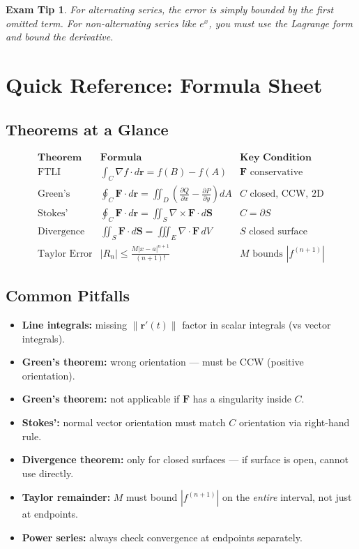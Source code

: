 \documentclass[12pt]{article}
\newcommand{\grad}{\nabla}
\newcommand{\curl}{\nabla\times}
\newcommand{\divg}{\nabla\cdot}
\newtheorem{tip}{Exam Tip}[section]
\begin{document}
\begin{tip}
For alternating series, the error is simply bounded by the first omitted term. For non-alternating series like \(e^x\), you must use the Lagrange form and bound the derivative.
\end{tip}

\section*{Quick Reference: Formula Sheet}
\subsection*{Theorems at a Glance}
\[
\begin{array}{lll}
\textbf{Theorem} & \textbf{Formula} & \textbf{Key Condition} \\
\hline
\text{FTLI} & \int_C \grad f\cdot d\mathbf{r}=f(B)-f(A) & \mathbf{F}\text{ conservative} \\
\text{Green's} & \oint_C \mathbf{F}\cdot d\mathbf{r}=\iint_D \left(\frac{\partial Q}{\partial x}-\frac{\partial P}{\partial y}\right)dA & C\text{ closed, CCW, 2D} \\
\text{Stokes'} & \oint_C \mathbf{F}\cdot d\mathbf{r}=\iint_S \curl\mathbf{F}\cdot d\mathbf{S} & C=\partial S \\
\text{Divergence} & \iint_S \mathbf{F}\cdot d\mathbf{S}=\iiint_E \divg\mathbf{F}\,dV & S\text{ closed surface} \\
\text{Taylor Error} & |R_n|\le \frac{M|x-a|^{n+1}}{(n+1)!} & M\text{ bounds }|f^{(n+1)}|
\end{array}
\]

\subsection*{Common Pitfalls}
\begin{itemize}
    \item \textbf{Line integrals:} missing \(\|\mathbf{r}'(t)\|\) factor in scalar integrals (vs vector integrals).
    \item \textbf{Green's theorem:} wrong orientation — must be CCW (positive orientation).
    \item \textbf{Green's theorem:} not applicable if \(\mathbf{F}\) has a singularity inside \(C\).
    \item \textbf{Stokes':} normal vector orientation must match \(C\) orientation via right-hand rule.
    \item \textbf{Divergence theorem:} only for closed surfaces — if surface is open, cannot use directly.
    \item \textbf{Taylor remainder:} \(M\) must bound \(|f^{(n+1)}|\) on the \emph{entire} interval, not just at endpoints.
    \item \textbf{Power series:} always check convergence at endpoints separately.
\end{itemize}
\end{document}
